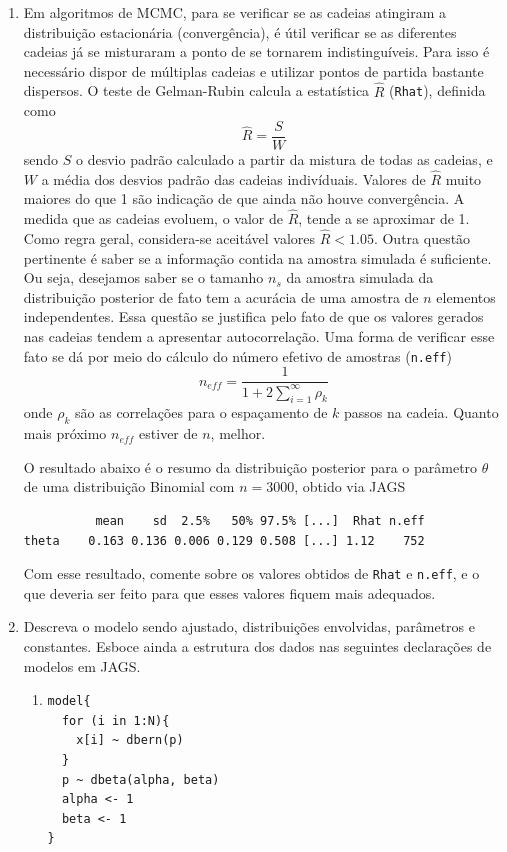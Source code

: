 \documentclass[11pt,a4]{article}\usepackage[]{graphicx}\usepackage[]{xcolor}
\begin{document}
\begin{enumerate}
\item Em algoritmos de MCMC, para se verificar se as cadeias
  atingiram a distribuição estacionária (convergência), é útil
  verificar se as diferentes cadeias já se misturaram a ponto de se
  tornarem indistinguíveis. Para isso é necessário dispor de
  múltiplas cadeias e utilizar pontos de partida bastante dispersos.
  O teste de Gelman-Rubin calcula a estatística $\hat{R}$
  (\texttt{Rhat}), definida como
  $$
  \hat{R} = \frac{S}{W}
  $$
  sendo $S$ o desvio padrão calculado a partir da mistura de todas as
  cadeias, e $W$ a média dos desvios padrão das cadeias indivíduais.
  Valores de $\hat{R}$ muito maiores do que 1 são indicação de que ainda
  não houve convergência. A medida que as cadeias evoluem, o valor de
  $\hat{R}$, tende a se aproximar de 1. Como regra geral, considera-se
  aceitável valores $\hat{R} < 1.05$. Outra questão pertinente é saber
  se a informação contida na amostra simulada é suficiente. Ou seja,
  desejamos saber se o tamanho $n_s$ da amostra simulada da distribuição
  posterior de fato tem a acurácia de uma amostra de $n$ elementos
  independentes. Essa questão se justifica pelo fato de que os valores
  gerados nas cadeias tendem a apresentar autocorrelação. Uma forma de
  verificar esse fato se dá por meio do cálculo do número efetivo de
  amostras (\texttt{n.eff})
  $$
  n_{eff} = \frac{1}{1 + 2 \sum_{i=1}^{\infty} \rho_k}
  $$
  onde $\rho_k$ são as correlações para o espaçamento de $k$ passos na
  cadeia. Quanto mais próximo $n_{eff}$ estiver de $n$, melhor.

  O resultado abaixo é o resumo da distribuição posterior para o
  parâmetro $\theta$ de uma distribuição Binomial com $n = 3000$, obtido
  via JAGS
\begin{verbatim}
          mean    sd  2.5%   50% 97.5% [...]  Rhat n.eff
theta    0.163 0.136 0.006 0.129 0.508 [...] 1.12    752
\end{verbatim}
  Com esse resultado, comente sobre os valores obtidos de \texttt{Rhat}
  e \texttt{n.eff}, e o que deveria ser feito para que esses valores
  fiquem mais adequados.




\item Descreva o modelo sendo ajustado, distribuições envolvidas, parâmetros e constantes.
  Esboce ainda a estrutura dos dados nas seguintes declarações de modelos em JAGS.

  \begin{enumerate}
  \item
\begin{verbatim}
model{
  for (i in 1:N){
    x[i] ~ dbern(p)
  }
  p ~ dbeta(alpha, beta)
  alpha <- 1
  beta <- 1
}
\end{verbatim}


\end{enumerate}
\end{enumerate}
\end{document}
